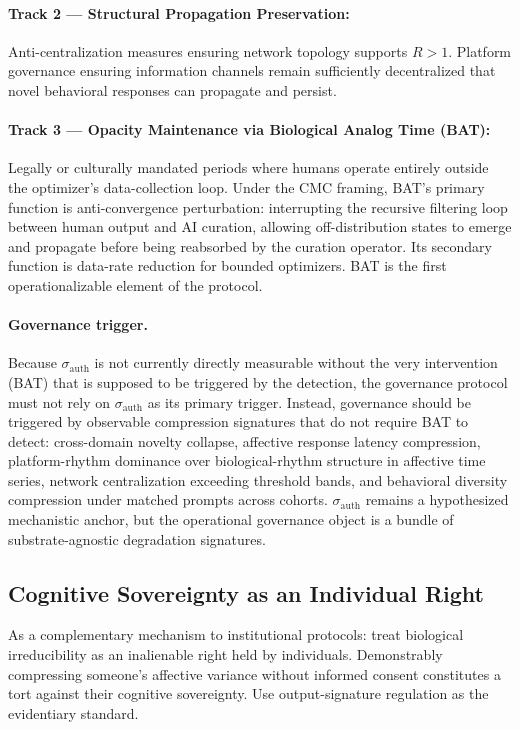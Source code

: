 \documentclass[11pt, a4paper]{article}
\theoremstyle{remark}
\begin{document}
\paragraph{Track 2 --- Structural Propagation Preservation:} Anti-centralization measures ensuring network topology supports $R > 1$. Platform governance ensuring information channels remain sufficiently decentralized that novel behavioral responses can propagate and persist.

\paragraph{Track 3 --- Opacity Maintenance via Biological Analog Time (BAT):} Legally or culturally mandated periods where humans operate entirely outside the optimizer's data-collection loop. Under the CMC framing, BAT's primary function is anti-convergence perturbation: interrupting the recursive filtering loop between human output and AI curation, allowing off-distribution states to emerge and propagate before being reabsorbed by the curation operator. Its secondary function is data-rate reduction for bounded optimizers. BAT is the first operationalizable element of the protocol.

\paragraph{Governance trigger.} Because $\sigma_{\text{auth}}$ is not currently directly measurable without the very intervention (BAT) that is supposed to be triggered by the detection, the governance protocol must not rely on $\sigma_{\text{auth}}$ as its primary trigger. Instead, governance should be triggered by observable compression signatures that do not require BAT to detect: cross-domain novelty collapse, affective response latency compression, platform-rhythm dominance over biological-rhythm structure in affective time series, network centralization exceeding threshold bands, and behavioral diversity compression under matched prompts across cohorts. $\sigma_{\text{auth}}$ remains a hypothesized mechanistic anchor, but the operational governance object is a bundle of substrate-agnostic degradation signatures.

\subsection{Cognitive Sovereignty as an Individual Right}\label{sec:cognitive-sov}

As a complementary mechanism to institutional protocols: treat biological irreducibility as an inalienable right held by individuals. Demonstrably compressing someone's affective variance without informed consent constitutes a tort against their cognitive sovereignty. Use output-signature regulation as the evidentiary standard.
\end{document}
